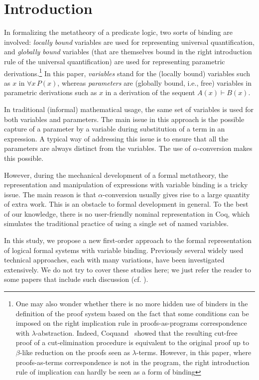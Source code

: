 \documentclass{svjour3}                     %
\begin{document}
\section{Introduction}
In formalizing the metatheory of a predicate logic, two sorts of binding are involved: \textit{locally bound} variables are used for representing universal quantification, and {\em globally bound} variables (that are themselves bound in the right introduction rule of the universal quantification) are used for representing parametric derivations.\footnote{One may also wonder whether there is no more hidden use of binders in the definition of the proof system based on the fact that some conditions can be imposed on the right implication rule in proofs-as-programs correspondence with $\lambda$-abstraction. Indeed, Coquand~\cite{cCoquand93} showed that the resulting cut-free proof of a cut-elimination procedure is equivalent to the original proof up to $\beta$-like reduction on the proofs seen as $\lambda$-terms. However, in this paper, where proofs-as-terms correspondence is not in the program, the right introduction rule of implication can hardly be seen as a form of binding}
In this paper, {\em variables} stand for the (locally bound) variables such as $x$ in $\forall x\, P(x)$, whereas {\em parameters} are (globally bound, i.e., free) variables in parametric derivations such as $x$ in a derivation of the sequent $A(x) \vdash B(x)$.

In traditional (informal) mathematical usage, the same set of variables is used for both  variables and parameters. The main issue in this approach is the possible capture of a parameter by a variable during substitution of a term in an expression. A typical way of addressing this issue is to ensure that all the parameters are always distinct from the variables. The use of $\alpha$-conversion makes this possible.

However, during the mechanical development of a formal metatheory, the representation and manipulation of expressions with variable binding is a tricky issue. The main reason is that $\alpha$-conversion usually gives rise to a large quantity of extra work. This is an obstacle to formal development in general. To the best of our knowledge, there is no user-friendly nominal representation in Coq, which simulates the traditional practice of using a single set of named variables.

In this study, we propose a new first-order approach to the formal
representation of logical formal systems with variable
binding. Previously several widely used technical approaches, each with
many variations, have been investigated extensively. We do not try to
cover these studies here; we just refer the reader to some papers that  include such discussion (cf. \cite{AmCrMo,engineering,deBruijn,GordonMelham,HarperLicata,mcpol99,nominalT}).
\end{document}
